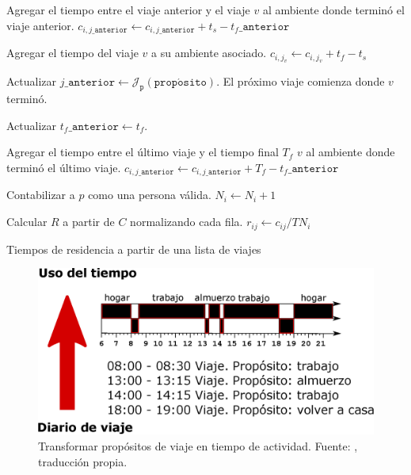 \begin{algorithm}[H]
{{{            Agregar el tiempo entre el viaje anterior y el viaje \(v\) al ambiente donde terminó el viaje anterior. \(c_{i, j\_\mathtt{anterior}} \gets c_{i, j\_\mathtt{anterior}} + t_s - t_f\_\mathtt{anterior}\)\;
            
            Agregar el tiempo del viaje \(v\) a su ambiente asociado. \(c_{i, j_v} \gets c_{i, j_v} + t_f - t_s\)\;
            
            Actualizar  \(j\_\mathtt{anterior} \gets \mathcal{J}_{\mathtt{p}}(\mathtt{prop\acute{o}sito})\). El próximo viaje comienza donde \(v\) terminó.
            
            Actualizar \(t_f\_\mathtt{anterior} \gets t_f\). 
        }
        
        Agregar el tiempo entre el último viaje y el tiempo final \(T_f\) \(v\) al ambiente donde terminó el último viaje. \(c_{i, j\_\mathtt{anterior}} \gets c_{i, j\_\mathtt{anterior}} + T_f - t_f\_\mathtt{anterior}\)\;
        
        Contabilizar a \(p\) como una persona válida. \(N_i \gets N_i + 1\)\;
    }
    
}

Calcular \(R\) a partir de \(C\) normalizando cada fila. \(r_{ij} \gets c_{ij} / T N_i\)\;

\caption{Tiempos de residencia a partir de una lista de viajes}
\label{alg:timematrix}
\end{algorithm}

\begin{figure}[H]
\centering
\includegraphics[width=.6\linewidth]{img/metodologia/matrizPnormal/ciclo-viajes.eps}
\caption[Transformar propósitos de viaje en tiempo de actividad.]{Transformar propósitos de viaje en tiempo de actividad. Fuente: \cite{Munizaga2011}, traducción propia.}
\label{img:ciclo-viajes}
\end{figure}

